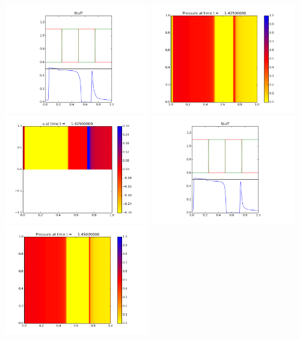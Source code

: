 \documentclass[11pt]{article}
\begin{document}
\vskip 10pt 
\includegraphics[width=0.475\textwidth]{frame0056fig3.png}
\vskip 10pt 
\includegraphics[width=0.475\textwidth]{frame0057fig0.png}
\includegraphics[width=0.475\textwidth]{frame0057fig1.png}
\vskip 10pt 
\includegraphics[width=0.475\textwidth]{frame0057fig3.png}
\vskip 10pt 
\includegraphics[width=0.475\textwidth]{frame0058fig0.png}
\end{document}
